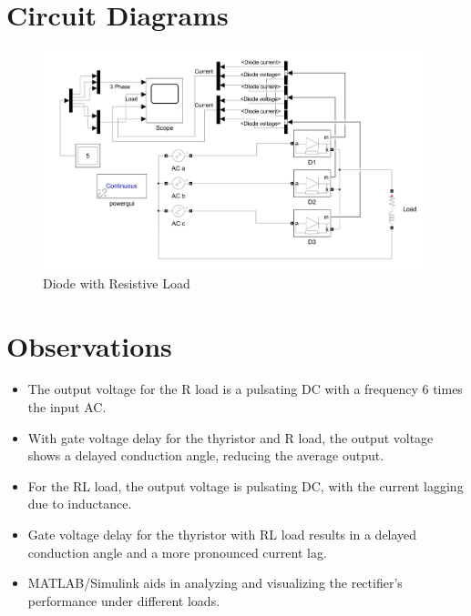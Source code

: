 \documentclass[12pt]{article}
\begin{document}
\section*{Circuit Diagrams}
\begin{figure}[H]
    \centering
    \includegraphics[width=\textwidth]{ckt.png}
    \caption{Diode with Resistive Load}
    \label{fig:dc_r_load}
\end{figure}

\section*{Observations}
\begin{itemize}
    \item The output voltage for the R load is a pulsating DC with a frequency 6 times the input AC.
    \item With gate voltage delay for the thyristor and R load, the output voltage shows a delayed conduction angle, reducing the average output.
    \item For the RL load, the output voltage is pulsating DC, with the current lagging due to inductance.
    \item Gate voltage delay for the thyristor with RL load results in a delayed conduction angle and a more pronounced current lag.
    \item MATLAB/Simulink aids in analyzing and visualizing the rectifier's performance under different loads.
\end{itemize}
\end{document}

